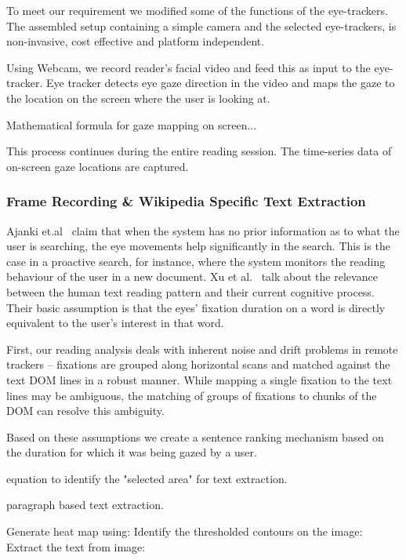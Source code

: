 \documentclass[12pt]{article}
\begin{document}
To meet our requirement we modified some of the functions of the eye-trackers. The assembled setup containing a simple camera and the selected eye-trackers, is non-invasive, cost effective and platform independent. 


Using Webcam, we record reader's facial video and feed this as input to the eye-tracker. Eye tracker detects eye gaze direction in the video and maps the gaze to the location on the screen where the user is looking at. 


Mathematical formula for gaze mapping on screen...

This process continues during the entire reading session. The time-series data of on-screen gaze locations are captured. 



\subsubsection{Frame Recording \& Wikipedia Specific Text Extraction}

Ajanki et.al~\cite{bff9c00ddce3404ca729f4a96d53a701} claim that when the system has no prior information as to what the user is searching, the eye movements help significantly in the search. This is the case in a proactive search, for instance, where the system monitors the reading behaviour of the user in a new document. Xu et al.~\cite{xu2009user} talk about the relevance between the human text reading pattern and their current cognitive process. Their basic assumption is that the eyes' fixation duration on a word is directly equivalent to the user's interest in that word. 


First, our reading analysis deals
with inherent noise and drift problems in remote trackers –
fixations are grouped along horizontal scans and matched
against the text DOM lines in a robust manner. While
mapping a single fixation to the text lines may be
ambiguous, the matching of groups of fixations to chunks
of the DOM can resolve this ambiguity. 

Based on these assumptions we create a sentence ranking mechanism based on the duration for which it was being gazed by a user.

equation to identify the "selected area" for text extraction.

\cite{c7691a9428684758a206610e6bd9ee3e} paragraph based text extraction.

Generate heat map using:
Identify the thresholded contours on the image:
Extract the text from image:
\end{document}

